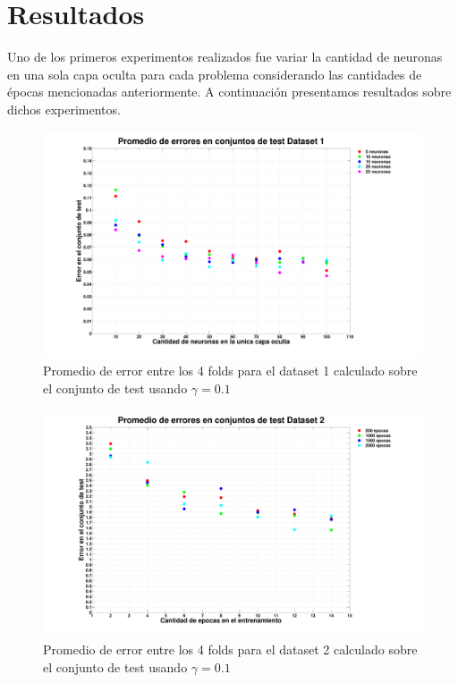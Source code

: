 \documentclass[informe.tex]{subfiles}
\begin{document}
  
  \section{Resultados}
  
    Uno de los primeros experimentos realizados fue variar la cantidad de neuronas en una sola capa oculta para cada problema considerando las cantidades de épocas mencionadas anteriormente. A continuación presentamos resultados sobre dichos experimentos.
    
    
    \begin{figure}[H]
      \begin{center}
	  \hspace*{-2cm}
	  \includegraphics[width=20cm]{graficos/d1_01.pdf}
	  \caption{Promedio de error entre los 4 folds para el dataset 1 calculado sobre el conjunto de test usando $\gamma=0.1$}
	  \label{fig:errorTest-d1}
      \end{center}
    \end{figure}

    \begin{figure}[H]
      \begin{center}
	  \hspace*{-2cm}
	  \includegraphics[width=20cm]{graficos/d2_01.pdf}
	  \caption{Promedio de error entre los 4 folds para el dataset 2 calculado sobre el conjunto de test usando $\gamma=0.1$}
	  \label{fig:errorTest-d2}
      \end{center}
    \end{figure}
    
\end{document}
